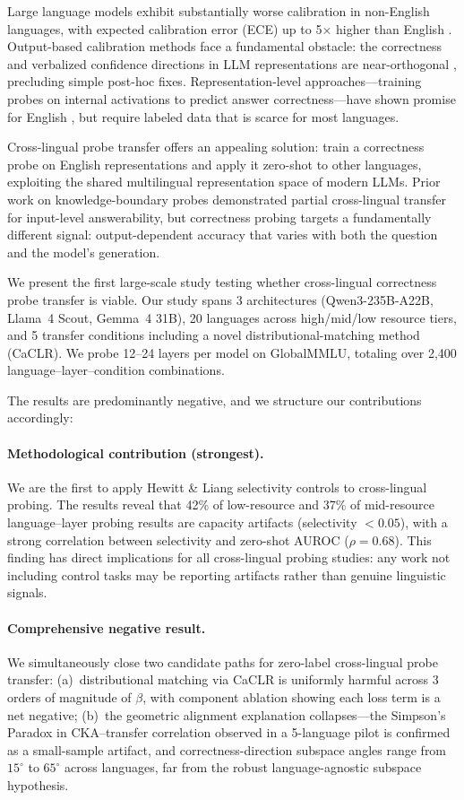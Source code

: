 \documentclass[11pt,a4paper]{article}
\newcommand{\auroc}{AUROC}
\newcommand{\ece}{ECE}
\begin{document}
Large language models exhibit substantially worse calibration in non-English languages, with expected calibration error (\ece{}) up to 5$\times$ higher than English \cite{}.
Output-based calibration methods face a fundamental obstacle: the correctness and verbalized confidence directions in LLM representations are near-orthogonal \cite{}, precluding simple post-hoc fixes.
Representation-level approaches---training probes on internal activations to predict answer correctness---have shown promise for English \cite{}, but require labeled data that is scarce for most languages.

Cross-lingual probe transfer offers an appealing solution: train a correctness probe on English representations and apply it zero-shot to other languages, exploiting the shared multilingual representation space of modern LLMs.
Prior work on knowledge-boundary probes \cite{} demonstrated partial cross-lingual transfer for input-level answerability, but correctness probing targets a fundamentally different signal: output-dependent accuracy that varies with both the question and the model's generation.

We present the first large-scale study testing whether cross-lingual correctness probe transfer is viable.
Our study spans 3 architectures (Qwen3-235B-A22B, Llama~4 Scout, Gemma~4 31B), 20 languages across high/mid/low resource tiers, and 5 transfer conditions including a novel distributional-matching method (CaCLR).
We probe 12--24 layers per model on GlobalMMLU, totaling over 2,400 language--layer--condition combinations.

The results are predominantly negative, and we structure our contributions accordingly:

\paragraph{Methodological contribution (strongest).}
We are the first to apply Hewitt \& Liang selectivity controls \cite{} to cross-lingual probing.
The results reveal that 42\% of low-resource and 37\% of mid-resource language--layer probing results are capacity artifacts (selectivity $< 0.05$), with a strong correlation between selectivity and zero-shot \auroc{} ($\rho = 0.68$).
This finding has direct implications for all cross-lingual probing studies: any work not including control tasks may be reporting artifacts rather than genuine linguistic signals.

\paragraph{Comprehensive negative result.}
We simultaneously close two candidate paths for zero-label cross-lingual probe transfer:
(a)~distributional matching via CaCLR is uniformly harmful across 3 orders of magnitude of $\beta$, with component ablation showing each loss term is a net negative;
(b)~the geometric alignment explanation collapses---the Simpson's Paradox in CKA--transfer correlation observed in a 5-language pilot is confirmed as a small-sample artifact, and correctness-direction subspace angles range from $15^\circ$ to $65^\circ$ across languages, far from the robust language-agnostic subspace hypothesis.
\end{document}
